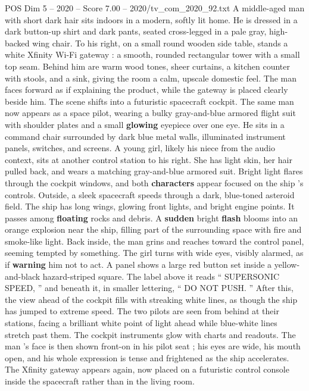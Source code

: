 \begin{textsample}{POS Dim 5 – 2020 – Score 7.00 – 2020/tv\_com\_2020\_92.txt}  \label{ex:f5_pos_068}
A middle-aged man with short dark hair sits indoors in a modern, softly lit home.
He is dressed in a dark button-up shirt and dark pants, seated cross-legged in a pale gray, high-backed wing chair.
To his right, on a small round wooden side table, stands a white Xfinity Wi-Fi gateway : a smooth, rounded rectangular tower with a small top seam.
Behind him are warm wood tones, sheer curtains, a kitchen counter with stools, and a sink, giving the room a calm, upscale domestic feel.
The man faces forward as if explaining the product, while the gateway is placed clearly beside him.
The scene shifts into a futuristic spacecraft cockpit.
The same man now appears as a space pilot, wearing a bulky gray-and-blue armored flight suit with shoulder plates and a small \textbf{glowing} eyepiece over one eye.
He sits in a command chair surrounded by dark blue metal walls, illuminated instrument panels, switches, and screens.
A young girl, likely his niece from the audio context, sits at another control station to his right.
She has light skin, her hair pulled back, and wears a matching gray-and-blue armored suit.
Bright light flares through the cockpit windows, and both \textbf{characters} appear focused on the ship ’s controls.
Outside, a sleek spacecraft speeds through a dark, blue-toned asteroid field.
The ship has long wings, glowing front lights, and bright engine points.
It passes among \textbf{floating} rocks and debris.
A \textbf{sudden} bright \textbf{flash} blooms into an orange explosion near the ship, filling part of the surrounding space with fire and smoke-like light.
Back inside, the man grins and reaches toward the control panel, seeming tempted by something.
The girl turns with wide eyes, visibly alarmed, as if \textbf{warning} him not to act.
A panel shows a large red button set inside a yellow-and-black hazard-striped square.
The label above it reads “ SUPERSONIC SPEED, ” and beneath it, in smaller lettering, “ DO NOT PUSH. ” After this, the view ahead of the cockpit fills with streaking white lines, as though the ship has jumped to extreme speed.
The two pilots are seen from behind at their stations, facing a brilliant white point of light ahead while blue-white lines stretch past them.
The cockpit instruments glow with charts and readouts.
The man ’s face is then shown front-on in his pilot seat ; his eyes are wide, his mouth open, and his whole expression is tense and frightened as the ship accelerates.
The Xfinity gateway appears again, now placed on a futuristic control console inside the spacecraft rather than in the living room.

\end{textsample}
